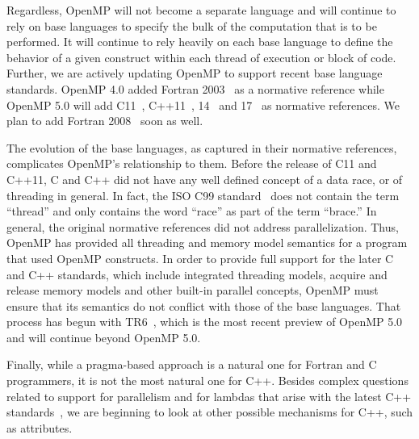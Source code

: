 Regardless, OpenMP will not become a separate language and will 
continue to rely on base languages to specify the bulk of the
computation that is to be performed. It will continue to rely heavily 
on each base language to define the behavior of a given construct 
within each thread of execution or block of code. Further, we are
actively updating OpenMP to support recent base language standards. 
OpenMP 4.0 added Fortran 2003~\cite{F2003} as a normative reference
while OpenMP 5.0 will add C11~\cite{c11}, C++11~\cite{c++11},
14~\cite{c++14} and 17~\cite{c++17} as normative references. We plan to add
Fortran 2008~\cite{F2008} soon as well.

The evolution of the base languages, as captured in their normative
references, complicates OpenMP's relationship to them. Before the 
release of C11 and C++11, C and C++ did not have any well defined 
concept of a data race, or of threading in general. In fact, the 
ISO C99 standard~\cite{c99} does not contain the term ``thread'' 
and only contains the word ``race'' as part of the term ``brace.''
In general, the original normative references did not address
parallelization. Thus, OpenMP has provided all threading and memory 
model semantics for a program that used OpenMP constructs. In 
order to provide full support for the later C and C++ standards, 
which include integrated threading models, acquire and release 
memory models and other built-in parallel concepts, OpenMP must 
ensure that its semantics do not conflict with those of the base
languages. That process has begun with TR6~\cite{openmptr6}, which is 
the most recent preview of OpenMP 5.0 and will continue beyond
OpenMP 5.0.

Finally, while a pragma-based approach is a natural one for Fortran
and C programmers, it is not the most natural one for C++. Besides
complex questions related to support for parallelism and for lambdas
that arise with the latest C++ standards~\cite{c++17}, we are beginning to look at
other possible mechanisms for C++, such as attributes.


